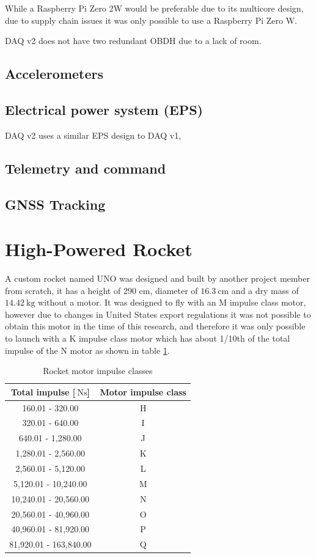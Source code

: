 \documentclass[a4paper,11pt]{article}
\begin{document}
While a Raspberry Pi Zero 2W would be preferable due to its multicore design, due to supply chain issues it was only possible to use a Raspberry Pi Zero W.

DAQ v2 does not have two redundant OBDH due to a lack of room.

\subsection{Accelerometers}

\subsection{Electrical power system (EPS)}

DAQ v2 uses a similar EPS design to DAQ v1, 

\subsection{Telemetry and command}
\subsection{GNSS Tracking}

\section{High-Powered Rocket}

A custom rocket named UNO was designed and built by another project member from scratch, it has a height of 290 cm, diameter of $\SI{16.3}{\centi\meter}$ and a dry mass of $\SI{14.42}{\kilo\gram}$ without a motor. It was designed to fly with an M impulse class motor, however due to changes in United States export regulations it was not possible to obtain this motor in the time of this research, and therefore it was only possible to launch with a K impulse class motor which has about 1/10th of the total impulse of the N motor as shown in table \ref{tabl:impulseclasses}.

\begin{table}[H]
\centering
\label{tabl:impulseclasses}
\begin{tabular}{|c|c|}
  Total impulse [$\SI{}{\newton\second}$] & Motor impulse class \\
  \hline
  160.01 - 320.00         & H \\
  320.01 - 640.00         & I \\
  640.01 - 1,280.00       & J \\
  1,280.01 - 2,560.00     & K \\
  2,560.01 - 5,120.00     & L \\
  5,120.01 - 10,240.00    & M \\
  10,240.01 - 20,560.00   & N \\
  20,560.01 - 40,960.00   & O \\
  40,960.01 - 81,920.00   & P \\
  81,920.01 - 163,840.00  & Q \\
\end{tabular}
\caption{Rocket motor impulse classes \cite{nfpa2018}}
\end{table}
\end{document}
